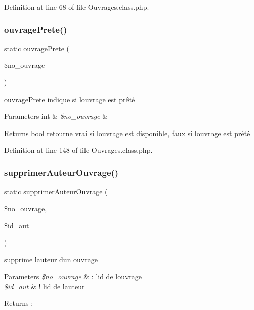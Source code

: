 Definition at line 68 of file Ouvrages.\+class.\+php.

\mbox{\label{class_ouvrages_aa9e652f19a5cf956a6a3fe4de72a1c88}} 
\subsubsection{\texorpdfstring{ouvrage\+Prete()}{ouvragePrete()}}
{\footnotesize\ttfamily static ouvrage\+Prete (\begin{DoxyParamCaption}\item[{}]{\$no\+\_\+ouvrage }\end{DoxyParamCaption})\hspace{0.3cm}{\ttfamily [static]}}

ouvrage\+Prete indique si l\textquotesingle{}ouvrage est prêté 
\begin{DoxyParams}[1]{Parameters}
int & {\em \$no\+\_\+ouvrage} & \\
\hline
\end{DoxyParams}
\begin{DoxyReturn}{Returns}
bool retourne vrai si l\textquotesingle{}ouvrage est disponible, faux si l\textquotesingle{}ouvrage est prêté 
\end{DoxyReturn}


Definition at line 148 of file Ouvrages.\+class.\+php.

\mbox{\label{class_ouvrages_a9f9eab8ac36a24575fd412cd7086df76}} 
\subsubsection{\texorpdfstring{supprimer\+Auteur\+Ouvrage()}{supprimerAuteurOuvrage()}}
{\footnotesize\ttfamily static supprimer\+Auteur\+Ouvrage (\begin{DoxyParamCaption}\item[{}]{\$no\+\_\+ouvrage,  }\item[{}]{\$id\+\_\+aut }\end{DoxyParamCaption})\hspace{0.3cm}{\ttfamily [static]}}

supprime l\textquotesingle{}auteur d\textquotesingle{}un ouvrage 
\begin{DoxyParams}{Parameters}
{\em \$no\+\_\+ouvrage} & \+: l\textquotesingle{}id de l\textquotesingle{}ouvrage \\
\hline
{\em \$id\+\_\+aut} & ! l\textquotesingle{}id de l\textquotesingle{}auteur \\
\hline
\end{DoxyParams}
\begin{DoxyReturn}{Returns}
\+: 
\end{DoxyReturn}


